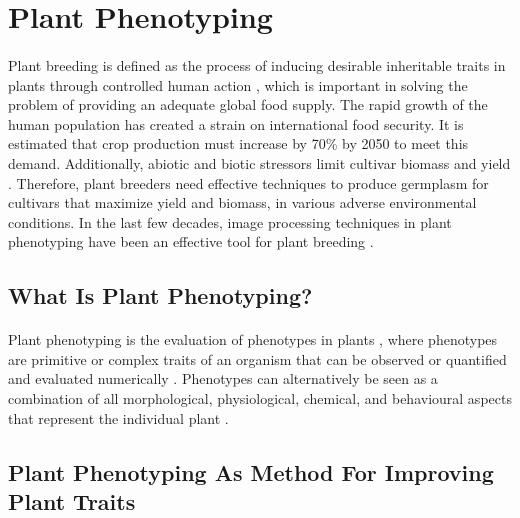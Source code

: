 \section{Plant Phenotyping}

\paragraph{}
Plant breeding is defined as the process of inducing desirable inheritable traits in plants through controlled human action \cite{ortonIntroduction2020}, which is important in solving the problem of providing an adequate global food supply. The rapid growth of the human population has created a strain on international food security. It is estimated that crop production must increase by 70\% by 2050 \cite{carvajal-yepesGlobalSurveillanceSystem2019} to meet this demand. Additionally, abiotic and biotic stressors limit cultivar biomass and yield \cite{grimeEvidenceExistenceThree1997}. Therefore, plant breeders need effective techniques to produce germplasm for cultivars that maximize yield and biomass, in various adverse environmental conditions. In the last few decades, image processing techniques in plant phenotyping have been an effective tool for plant breeding \cite{anandBreedingTechniquesDispense2023}.

\subsection{What Is Plant Phenotyping?}

\paragraph{}
Plant phenotyping is the evaluation of phenotypes in plants \cite{fioraniFutureScenariosPlant2013}, where phenotypes are primitive or complex traits of an organism that can be observed or quantified and evaluated numerically \cite{johannsenGenotypeConceptionHeredity1911a}.  Phenotypes can alternatively be seen as a combination of all morphological, physiological, chemical, and behavioural aspects that represent the individual plant \cite{guoPhenotypingPlants2014, mohammedReviewPlantPhenotyping, liReviewImagingTechniques2014}. 

\subsection{Plant Phenotyping As Method For Improving Plant Traits}

